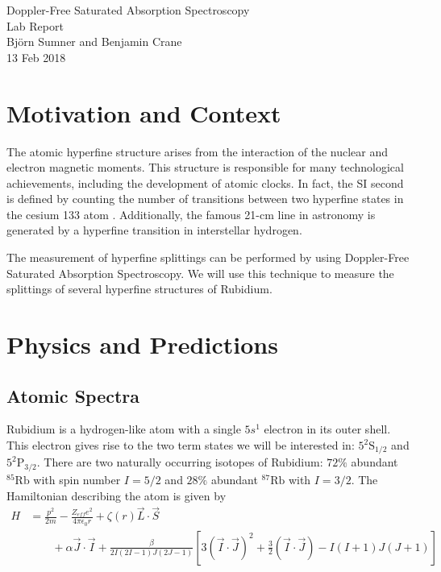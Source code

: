 \documentclass[12pt]{article}
\begin{document}
\begin{center}
{\Large Doppler-Free Saturated Absorption Spectroscopy} \\
{\Large Lab Report} \\[.3in]
{\large Bj\"{o}rn Sumner and Benjamin Crane} \\
{13 Feb 2018}
\end{center}

\section*{Motivation and Context}

The atomic hyperfine structure arises from the interaction of the nuclear and electron magnetic moments.  This structure is responsible for many technological achievements, including the development of atomic clocks.  In fact, the SI second is defined by counting the number of transitions between two hyperfine states in the cesium 133 atom \cite{NISTsec}.  Additionally, the famous 21-cm line in astronomy is generated by a hyperfine transition in interstellar hydrogen\cite{21cmPred}.

The measurement of hyperfine splittings can be performed by using Doppler-Free Saturated Absorption Spectroscopy.  We will use this technique to measure the splittings of several hyperfine structures of Rubidium.

\section*{Physics and Predictions}

\subsection*{Atomic Spectra}
Rubidium is a hydrogen-like atom with a single $5s^1$ electron in its outer shell.  This electron gives rise to the two term states we will be interested in: $5^2\text{S}_{1/2}$ and $5^2\text{P}_{3/2}$.  There are two naturally occurring isotopes of Rubidium: $72\%$ abundant ${}^{85}\text{Rb}$ with spin number $I=5/2$ and $28\%$ abundant ${}^{87}\text{Rb}$ with $I = 3/2$.
The Hamiltonian describing the atom is given by
\begin{align}
	H &= \frac{p^2}{2m} - \frac{Z_{eff} e^2}{4 \pi \epsilon_0 r} + \zeta(r) \vec{L}\cdot \vec{S} \nonumber\\
	&\qquad + \alpha \vec{J}\cdot \vec{I} + \frac{\beta}{2I(2I-1)J(2J-1)}\left[3(\vec{I}\cdot \vec{J})^2 + \frac{3}{2}(\vec{I}\cdot \vec{J}) - I(I+1)J(J+1)\right]
\end{align}
\end{document}
